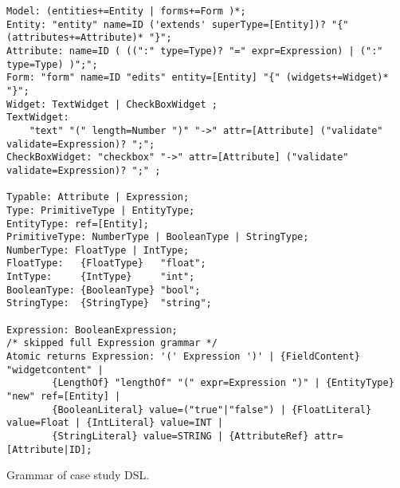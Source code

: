 % 
% 


% 

%

\begin{listing}[tb]
\begin{lstlisting}[language=xtext] 
Model: (entities+=Entity | forms+=Form )*;
Entity: "entity" name=ID ('extends' superType=[Entity])? "{" (attributes+=Attribute)* "}";
Attribute: name=ID ( ((":" type=Type)? "=" expr=Expression) | (":" type=Type) )";";
Form: "form" name=ID "edits" entity=[Entity] "{" (widgets+=Widget)* "}";
Widget: TextWidget | CheckBoxWidget ;
TextWidget:
	"text" "(" length=Number ")" "->" attr=[Attribute] ("validate" validate=Expression)? ";";
CheckBoxWidget: "checkbox" "->" attr=[Attribute] ("validate" validate=Expression)? ";" ;

Typable: Attribute | Expression;
Type: PrimitiveType | EntityType;
EntityType: ref=[Entity];
PrimitiveType: NumberType | BooleanType | StringType;
NumberType: FloatType | IntType;
FloatType:   {FloatType}   "float";
IntType:     {IntType}     "int";
BooleanType: {BooleanType} "bool";
StringType:	 {StringType}  "string";

Expression: BooleanExpression;
/* skipped full Expression grammar */
Atomic returns Expression: '(' Expression ')' | {FieldContent} "widgetcontent" |
		{LengthOf} "lengthOf" "(" expr=Expression ")" | {EntityType} "new" ref=[Entity] | 
		{BooleanLiteral} value=("true"|"false") | {FloatLiteral} value=Float | {IntLiteral} value=INT |
		{StringLiteral} value=STRING | {AttributeRef} attr=[Attribute|ID];
\end{lstlisting}
\caption{Grammar of case study DSL.}
\label{lst:grammar-plain}
\end{listing}


